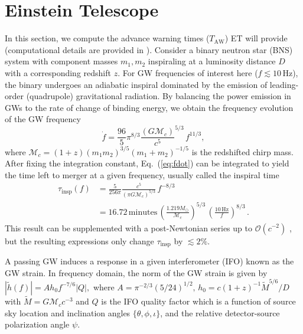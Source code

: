 \documentclass{aa}
\newcommand{\be}{\begin{equation}}
\newcommand{\ee}{\end{equation}}
\newcommand{\f}{\frac}
\newcommand{\nn}{\nonumber}
\newcommand{\ord}{\mathcal{O}}
\newcommand{\M}{\mathcal{M}_c}
\begin{document}
\section{Einstein Telescope}
\label{sect:et}
In this section, we compute the advance warning times ($T_\text{AW}$) ET will provide (computational details are provided in \cite{Akcay18}).
Consider a binary neutron star (BNS) system with component masses
$m_1, m_2$ inspiraling at a luminosity distance $D$ with a corresponding redshift $z$. For GW frequencies of interest here ($f \lesssim 10\,$Hz), the binary undergoes an adiabatic inspiral dominated by
the emission of leading-order (quadrupole)
gravitational radiation. By balancing the
power emission in GWs to the rate of change of binding energy, we obtain the frequency evolution of the GW frequency
%
\be
\dot{f} = \f{96}{5}\pi^{8/3} \f{(G \mathcal{M}_c)}{c^5}^{5/3}\, f^{11/3}, \label{eq:fdot}
\ee
where $\mathcal{M}_c  = (1+z){(m_1 m_2)^{3/5}}{(m_1+m_2)^{-1/5}}$ is the redshifted chirp mass. 
After fixing the integration constant, Eq.~(\ref{eq:fdot})
can be integrated to yield the time left to merger at a given frequency, usually called the inspiral time
%
\begin{align}
\tau_\text{insp}(f) &= \f{5}{256\pi}\f{c^5}{(\pi G \M)^{5/3}} \,f^{-8/3}\nn\\
&=16.72\,\text{minutes} \, \left(\f{1.219 M_\odot}{\M}\right)^{5/3}\,\left(\f{10\,\text{Hz}}{f}\right)^{8/3}
\label{eq:tau_insp}\, .
\end{align}
%
This result can be supplemented with a post-Newtonian series up to $\ord(c^{-2})$ \citep{Blanchet_LRR}, but the resulting expressions
 only change $\tau_\text{insp}$ by $\lesssim 2\%$.

A passing GW induces a response in a given interferometer (IFO) known as the GW strain. %
In frequency domain, the norm of the GW strain is given by
%
$|\tilde{h}(f)|=A h_0 f^{-7/6} |Q|,$ %
%
where $A= \pi^{-2/3}(5/24)^{1/2},\, h_0 = c  (1+z)^{-1}\tilde{M}^{5/6}/D$ with $\tilde{M}= G \M c^{-3}$ and $Q$ is the IFO quality factor which is a function of source sky location and inclination angles $\{\theta,\phi, \iota\}$, and the relative detector-source polarization angle $\psi$.
\end{document}
